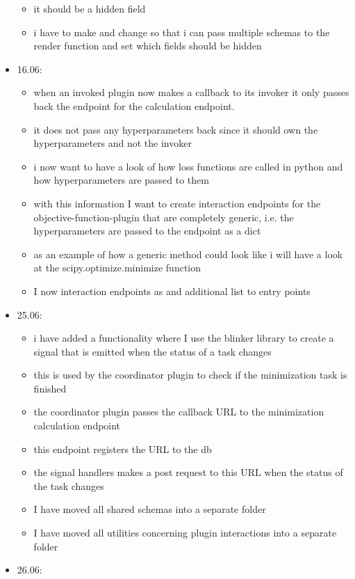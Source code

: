 \documentclass[
  a4paper,  %
  twoside,  %
  bibliography=totoc,
  headsepline,
  cleardoublepage=empty,
  parskip=half,
  draft=false
]{scrbook}
\begin{document}
\begin{itemize}
\begin{itemize}
    \item it should be a hidden field
    \item i have to make and change so that i can pass multiple schemas to the render function and set which fields should be hidden
  \end{itemize}
  \item 16.06:
  \begin{itemize}
    \item when an invoked plugin now makes a callback to its invoker it only passes back the endpoint for the calculation endpoint. 
    \item it does not pass any hyperparameters back since it should own the hyperparameters and not the invoker
    \item i now want to have a look of how loss functions are called in python and how hyperparameters are passed to them
    \item with this information I want to create interaction endpoints for the objective-function-plugin that are completely generic, i.e. the hyperparameters are passed to the endpoint as a dict
    \item as an example of how a generic method could look like i will have a look at the scipy.optimize.minimize function
    \item I now interaction endpoints as and additional list to entry points
  \end{itemize}
  \item 25.06:
  \begin{itemize}
    \item i have added a functionality where I use the blinker library to create a signal that is emitted when the status of a task changes
    \item this is used by the coordinator plugin to check if the minimization task is finished
    \item the coordinator plugin passes the callback URL to the minimization calculation endpoint
    \item this endpoint registers the URL to the db
    \item the signal handlers makes a post request to this URL when the status of the task changes
    \item I have moved all shared schemas into a separate folder
    \item I have moved all utilities concerning plugin interactions into a separate folder
  \end{itemize}
  \item 26.06:

\end{itemize}
\end{document}
